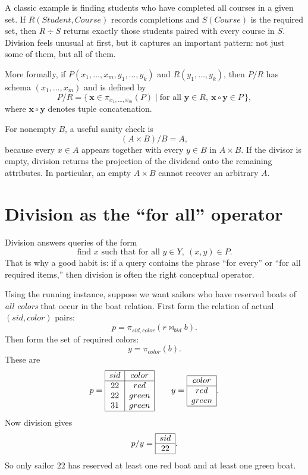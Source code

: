 \documentclass[11pt,a4paper,openany]{book}
\newcommand{\RAproject}{\pi}
\newcommand{\join}{\bowtie}
\begin{document}
A classic example is finding students who have completed all courses in a given set. If \(R(Student,Course)\) records completions and \(S(Course)\) is the required set, then \(R \div S\) returns exactly those students paired with every course in \(S\). Division feels unusual at first, but it captures an important pattern: not just some of them, but all of them.

More formally, if \(P(x_1,\dots,x_m,y_1,\dots,y_k)\) and \(R(y_1,\dots,y_k)\), then \(P/R\) has schema \((x_1,\dots,x_m)\) and is defined by
\[
P/R=\{\,\mathbf{x}\in \RAproject_{x_1,\dots,x_m}(P)\mid
\text{for all }\mathbf{y}\in R,\ \mathbf{x}\circ \mathbf{y}\in P\,\},
\]
where \(\mathbf{x}\circ \mathbf{y}\) denotes tuple concatenation.

For nonempty \(B\), a useful sanity check is
\[
(A\times B)/B = A,
\]
because every \(x\in A\) appears together with every \(y\in B\) in \(A\times B\). If the divisor is empty, division returns the projection of the dividend onto the remaining attributes. In particular, an empty \(A\times B\) cannot recover an arbitrary \(A\).

\section{Division as the ``for all'' operator}
Division answers queries of the form
\[
\text{find }x\text{ such that for all }y\in Y,\ (x,y)\in P.
\]
That is why a good habit is: if a query contains the phrase ``for every'' or ``for all required items,'' then division is often the right conceptual operator.

Using the running instance, suppose we want sailors who have reserved boats of \emph{all colors} that occur in the boat relation. First form the relation of actual \((sid,color)\) pairs:
\[
p=\RAproject_{sid,color}(r \join_{bid} b).
\]
Then form the set of required colors:
\[
y=\RAproject_{color}(b).
\]
These are
\[
p=
\begin{array}{|c|c|}\hline
sid&color\\\hline
22&red\\
22&green\\
31&green\\\hline
\end{array}
\qquad
y=
\begin{array}{|c|}\hline
color\\\hline
red\\
green\\\hline
\end{array}.
\]
Now division gives
\[
p/y=
\begin{array}{|c|}\hline
sid\\\hline
22\\\hline
\end{array}.
\]
So only sailor \(22\) has reserved at least one red boat and at least one green boat.
\end{document}
